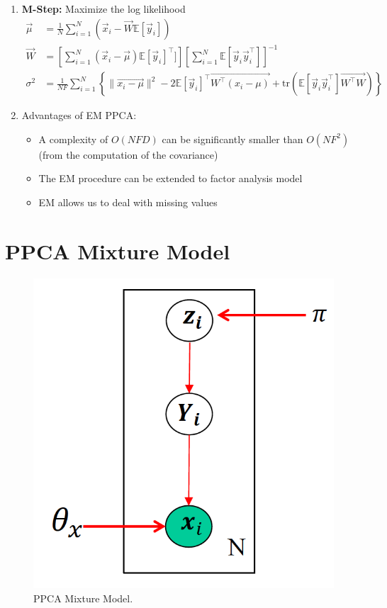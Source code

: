 \documentclass[12pt,twoside]{article}
\begin{document}
\begin{enumerate}
\item \textbf{M-Step:} Maximize the log likelihood
\begin{align*}
\vec{\mu}&= \frac{1}{N}\sum_{i=1}^N(\vec{x}_i - \vec{W}\mathbb{E}[\vec{y}_i])\\
\vec{W}&=\left[\sum_{i=1}^N (\vec{x}_i - \vec{\mu})\mathbb{E}[\vec{y}_i]^\top]\right]\left[\sum_{i=1}^N \mathbb{E}[\vec{y}_i\vec{y}_i^\top]\right]^{-1}\\
\sigma^2&=\frac{1}{NF}\sum_{i=1}^N\left\lbrace \parallel \vec{x_i-\mu} \parallel^2 -2\mathbb{E}[\vec{y}_i]^\top\vec{W^\top (x_i-\mu)} +\text{tr}(\mathbb{E}[\vec{y}_i\vec{y}_i^\top]\vec{W^\top W})\right\rbrace
\end{align*}


\item Advantages of EM PPCA:
\begin{itemize}
\item A complexity of $O(NFD)$ can be significantly smaller than $O(NF^2)$ (from the computation of the covariance)
\item The EM procedure can be extended to factor analysis model
\item EM allows us to deal with missing values
\end{itemize}

\end{enumerate}


\section{PPCA Mixture Model}

\begin{figure}[H]
\begin{center}
\includegraphics[width = 0.4\hsize]{./figures/PPCAMixture.png} %
\caption{PPCA Mixture Model.} %
\label{fig:PPCA Mixture Model} %
\end{center}
\end{figure}
\end{document}
